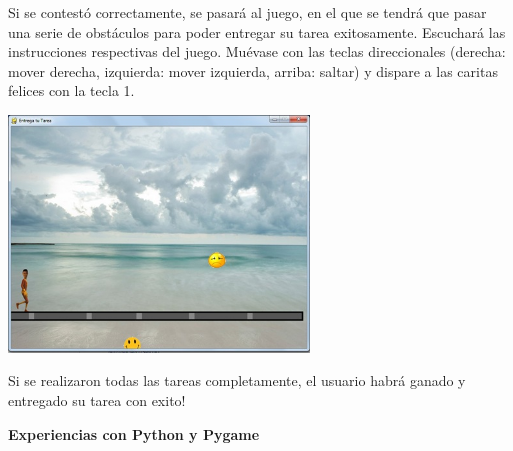 \documentclass[12pt]{report}
\begin{document}

Si se contestó correctamente, se pasará al juego, en el que se tendrá que pasar una serie de obstáculos para poder entregar su tarea exitosamente.
Escuchará las instrucciones respectivas del juego.
Muévase con las teclas direccionales (derecha: mover derecha, izquierda: mover izquierda, arriba: saltar) y dispare a las caritas felices con la tecla 1.

	\begin{center}
		\begingroup
			\includegraphics[width=0.6\textwidth]{imagenes_usuario/juego1.jpg}
		\endgroup
	\end{center}


Si se realizaron todas las tareas completamente, el usuario habrá ganado y entregado su tarea con exito!

	\begingroup
		\large{
			\textbf{
				\newline
				\newline
				\newline
				Experiencias con Python y Pygame
				\newline
				\newline
			}
		}
	\endgroup
\end{document}
